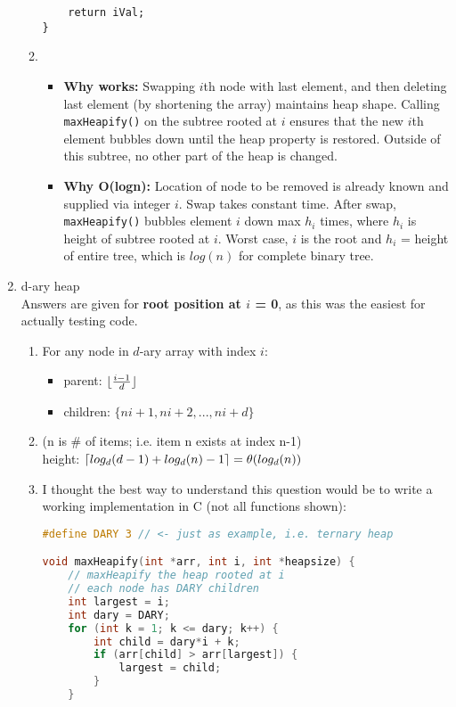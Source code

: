 \documentclass{article}
\DeclarePairedDelimiter{\ceil}{\lceil}{\rceil}
\DeclarePairedDelimiter{\floor}{\lfloor}{\rfloor}
\begin{document}
\begin{enumerate}
\begin{enumerate}
\begin{lstlisting}
	return iVal;
}
		\end{lstlisting}
		
		\item 
		\begin{itemize}
			\item \textbf{Why works:} Swapping $i$th node with last element, and then deleting last element (by shortening the array) maintains heap shape. Calling \texttt{maxHeapify()} on the subtree rooted at $i$ ensures that the new $i$th element bubbles down until the heap property is restored. Outside of this subtree, no other part of the heap is changed.
			\item \textbf {Why O(logn):} Location of node to be removed is already known and supplied via integer $i$. Swap takes constant time. After swap, \texttt{maxHeapify()} bubbles element $i$ down max $h_i$ times, where $h_i$ is height of subtree rooted at $i$. Worst case, $i$ is the root and $h_i$ = height of entire tree, which is $log(n)$ for complete binary tree.
		\end{itemize}
		
	\end{enumerate}
	
	\item d-ary heap \\
	Answers are given for \textbf{root position at $i$ = 0}, as this was the easiest for actually testing code.
	\begin{enumerate}
		\item For any node in $d$-ary array with index $i$:
		\begin{itemize}
			\item parent: $\floor{\frac{i-1}{d}}$
			\item children: $\{ni+1, ni+2, ... , ni+d\}$
		\end{itemize}
		\item (n is \# of items; i.e. item n exists at index n-1) \\
		height: $\ceil{log_d(d-1) + log_d(n) -1 } = \theta(log_d(n))$
		\newpage
		\item I thought the best way to understand this question would be to write a working implementation in C (not all functions shown):
		
\begin{lstlisting}[language=C,style=CStyle]
#define DARY 3 // <- just as example, i.e. ternary heap

void maxHeapify(int *arr, int i, int *heapsize) { 
	// maxHeapify the heap rooted at i
	// each node has DARY children
	int largest = i;
	int dary = DARY;
	for (int k = 1; k <= dary; k++) {
		int child = dary*i + k;
		if (arr[child] > arr[largest]) {
			largest = child;
		}
	}


\end{lstlisting}
\end{enumerate}
\end{enumerate}
\end{document}
